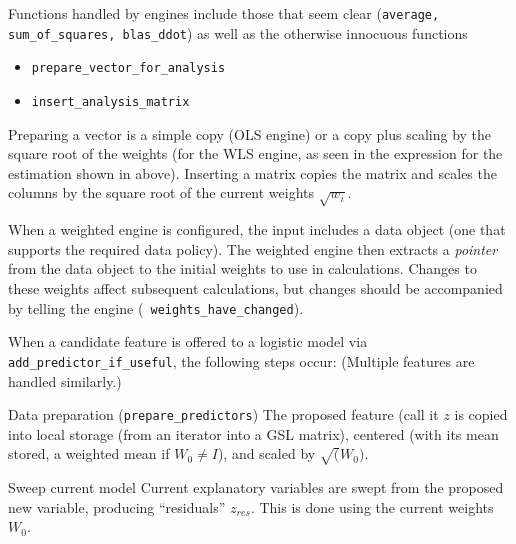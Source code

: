 \documentclass[12pt]{article}
\begin{document}
 Functions handled by engines include those that seem clear ({\tt average,
 sum\_of\_squares, blas\_ddot}) as well as the otherwise innocuous functions
\begin{itemize}
  \item {\tt prepare\_vector\_for\_analysis}
  \item {\tt insert\_analysis\_matrix}
\end{itemize}
 Preparing a vector is a simple copy (OLS engine) or a copy plus scaling by the
 square root of the weights (for the WLS engine, as seen in the expression for
 the estimation shown in  above).  Inserting a matrix copies the
 matrix and scales the columns by the square root of the current weights
 $\sqrt{w_i}$.


 When a weighted engine is configured, the input includes a data object (one
 that supports the required data policy).  The weighted engine then extracts a
 {\em pointer} from the data object to the initial weights to use in
 calculations.  Changes to these weights affect subsequent calculations, but
 changes should be accompanied by telling the engine ({\tt
 weights\_have\_changed}).


 When a candidate feature is offered to a logistic model via {\tt
 add\_predictor\_if\_useful}, the following steps occur: (Multiple features are
 handled similarly.)
\begin{description}
 \item{Data preparation} ({\tt prepare\_predictors}) The proposed feature (call
 it $z$ is copied into local storage (from an iterator into a GSL matrix),
 centered (with its mean stored, a weighted mean if $W_0 \ne I$), and scaled by
 $\sqrt(W_0)$.
 \item{Sweep current model} Current explanatory variables are swept from the
 proposed new variable, producing ``residuals'' $z_{res}$.  This is done using
 the current weights $W_0$.
\end{description}


 
 
\end{document}
